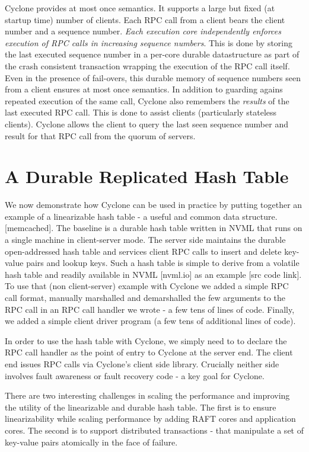 \documentclass[letterpaper,twocolumn,10pt]{article}
\begin{document}
Cyclone provides at most once semantics. It supports a large but fixed (at
startup time) number of clients. Each RPC call from a client bears the client
number and a sequence number. \emph{Each execution core independently enforces
  execution of RPC calls in increasing sequence numbers}. This is done by
storing the last executed sequence number in a per-core durable datastructure as
part of the crash consistent transaction wrapping the execution of the RPC call
itself. Even in the presence of fail-overs, this durable memory of sequence
numbers seen from a client ensures at most once semantics. In addition to
guarding agains repeated execution of the same call, Cyclone also remembers the
\emph{results} of the last executed RPC call. This is done to assist clients
(particularly stateless clients). Cyclone allows the client to query the last
seen sequence number and result for that RPC call from the quorum of servers.

\section{A Durable Replicated Hash Table}
\label{sec:example}
We now demonstrate how Cyclone can be used in practice by putting together an
example of a linearizable hash table - a useful and common data structure.
[memcached]. The baseline is a durable hash table written in NVML that runs on a
single machine in client-server mode. The server side maintains the durable
open-addressed hash table and services client RPC calls to insert and delete
key-value pairs and lookup keys. Such a hash table is simple to derive from a
volatile hash table and readily available in NVML [nvml.io] as an example [src
  code link]. To use that (non client-server) example with Cyclone we added a
simple RPC call format, manually marshalled and demarshalled the few
arguments to the RPC call in an RPC call handler we wrote - a few tens of lines
of code. Finally, we added a simple client driver program (a few tens of
additional lines of code).

In order to use the hash table with Cyclone, we simply need to to declare the
RPC call handler as the point of entry to Cyclone at the server end.  The client
end issues RPC calls via Cyclone's client side library. Crucially neither side
involves fault awareness or fault recovery code - a key goal for Cyclone.

There are two interesting challenges in scaling the performance and improving
the utility of the linearizable and durable hash table. The first is to ensure
linearizability while scaling performance by adding RAFT cores and application
cores. The second is to support distributed transactions - that manipulate a set
of key-value pairs atomically in the face of failure.
\end{document}
